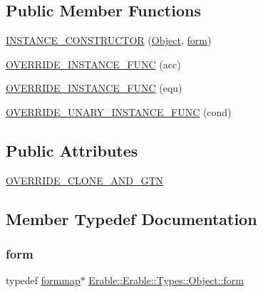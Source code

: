 \subsection*{Public Member Functions}
\begin{DoxyCompactItemize}
\item 
\mbox{\hyperlink{class_erable_1_1_erable_1_1_types_1_1_object_a2edfbab715a02610c9b0c294425fad1c}{I\+N\+S\+T\+A\+N\+C\+E\+\_\+\+C\+O\+N\+S\+T\+R\+U\+C\+T\+OR}} (\mbox{\hyperlink{class_erable_1_1_erable_1_1_types_1_1_object}{Object}}, \mbox{\hyperlink{class_erable_1_1_erable_1_1_types_1_1_object_ad26eec63322773e4ed4ea6fc56dfa073}{form}})
\item 
\mbox{\hyperlink{class_erable_1_1_erable_1_1_types_1_1_object_a73911a7fd10c869d3674dad795ccdc1f}{O\+V\+E\+R\+R\+I\+D\+E\+\_\+\+I\+N\+S\+T\+A\+N\+C\+E\+\_\+\+F\+U\+NC}} (acc)
\item 
\mbox{\hyperlink{class_erable_1_1_erable_1_1_types_1_1_object_a12fbbcf8d7c21513250aeeffbd6bf982}{O\+V\+E\+R\+R\+I\+D\+E\+\_\+\+I\+N\+S\+T\+A\+N\+C\+E\+\_\+\+F\+U\+NC}} (equ)
\item 
\mbox{\hyperlink{class_erable_1_1_erable_1_1_types_1_1_object_aa4d92a6c6681f570f554ba5256590151}{O\+V\+E\+R\+R\+I\+D\+E\+\_\+\+U\+N\+A\+R\+Y\+\_\+\+I\+N\+S\+T\+A\+N\+C\+E\+\_\+\+F\+U\+NC}} (cond)
\end{DoxyCompactItemize}
\subsection*{Public Attributes}
\begin{DoxyCompactItemize}
\item 
\mbox{\hyperlink{class_erable_1_1_erable_1_1_types_1_1_object_a10aa875c72a24a0cce80136f6b20dc36}{O\+V\+E\+R\+R\+I\+D\+E\+\_\+\+C\+L\+O\+N\+E\+\_\+\+A\+N\+D\+\_\+\+G\+TN}}
\end{DoxyCompactItemize}


\subsection{Member Typedef Documentation}
\mbox{\label{class_erable_1_1_erable_1_1_types_1_1_object_ad26eec63322773e4ed4ea6fc56dfa073}} 
\subsubsection{\texorpdfstring{form}{form}}
{\footnotesize\ttfamily typedef \mbox{\hyperlink{class_erable_1_1_erable_1_1_types_1_1_object_a02986c32b60bd5ce3d6393d637b8e040}{formmap}}$\ast$ \mbox{\hyperlink{class_erable_1_1_erable_1_1_types_1_1_object_ad26eec63322773e4ed4ea6fc56dfa073}{Erable\+::\+Erable\+::\+Types\+::\+Object\+::form}}}

